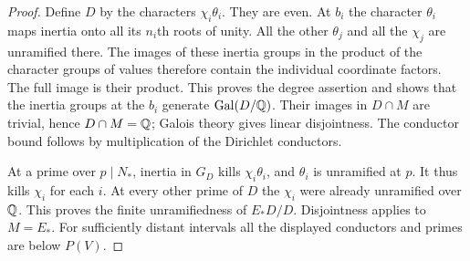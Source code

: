 \documentclass[a4paper,11pt]{article}
\theoremstyle{definition}
\theoremstyle{remark}
\numberwithin{equation}{section}
\begin{document}
\begin{proof}
Define \(D\) by the characters \(\chi_i\theta_i\). They are even.
At \(b_i\) the character \(\theta_i\) maps inertia onto all its
\(n_i\)th roots of unity. All the other \(\theta_j\) and all the
\(\chi_j\) are unramified there. The images of these inertia
groups in the product of the character groups of values therefore
contain the individual coordinate factors. The full image is
their product. This proves the degree assertion and shows that
the inertia groups at the \(b_i\) generate \(\operatorname{Gal}(D/\mathbb Q)\).
Their images in \(D\cap M\) are trivial, hence \(D\cap M=\mathbb Q\);
Galois theory gives linear disjointness. The conductor bound
follows by multiplication of the Dirichlet conductors.

At a prime over \(p\mid N_*\), inertia in \(G_D\) kills
\(\chi_i\theta_i\), and \(\theta_i\) is unramified at \(p\).
It thus kills \(\chi_i\) for each \(i\). At every other prime of
\(D\) the \(\chi_i\) were already unramified over \(\mathbb Q\).
This proves the finite unramifiedness of \(E_*D/D\). Disjointness
applies to \(M=E_*\). For sufficiently distant intervals all
the displayed conductors and primes are below \(P(V)\).
\end{proof}
\end{document}
